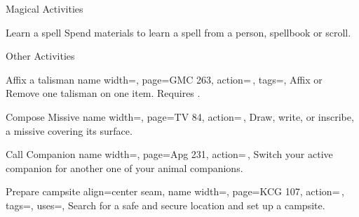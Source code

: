 \begin{PageFront}
\begin{Tables}{\frontTableHeight}
\begin{Table}{Magical Activities}
\begin{entry}{Learn a spell}
{            }
                Spend materials to learn a spell from a person, spellbook or scroll. \hfill
                \\
                \hphantom{t}\hfill{}\quad
            \end{entry}
        \end{Table}
        \TableSpace
        \begin{Table}{Other Activities}
            \begin{entry}{Affix a talisman}{%
                name width=\activityLength,%
                page=GMC 263,
                action=\,,
                tags=\Manipulate,
            }
                Affix or Remove one talisman on one item. Requires .\hfill
            \end{entry}
            \begin{entry}{Compose Missive}{%
                name width=\activityLength,%
                page=TV 84,
                action=\,,
            }
                Draw, write, or inscribe, a missive covering its surface.\hfill
            \end{entry}
            \begin{entry}{Call Companion}{%
                name width=\activityLength,%
                page=Apg 231,
                action=\,,
            }
                Switch your active companion for another one of your animal companions.
            \end{entry}
            \begin{entry}{Prepare campsite}{%
                align=center seam,
                name width=\activityLength,%
                page=KCG 107,
                action=\,,
                tags=\Concentrate\Move,
                uses=\Survival,
            }
                Search for a safe and secure location and set up a campsite.\hfill
                \\
                \hfill
                \hfill
            \end{entry}
        \end{Table}

\end{Tables}
\end{PageFront}

